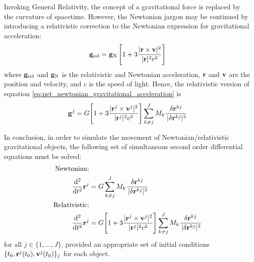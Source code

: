 \documentclass[reprint,english]{revtex4-1}
\begin{document}
Invoking General Relativity, the concept of a gravitational force is replaced by the curvature of spacetime. However, the Newtonian jargon may be continued by introducing a relativistic correction to the Newtonian expression for gravitational acceleration:
\begin{equation}\label{eq:relativistic_gravitational_acceleration}
\vb{g}_\text{rel}=\vb{g}_\text{N}\,\Bigg[1+3\frac{|\vb{r}\times\vb{v}|^2}{|\vb{r}|^2c^2}\Bigg]
\end{equation}
where \(\vb{g}_\text{rel}\) and \(\vb{g}_\text{N}\) is the relativistic and Newtonian acceleration, \(\vb{r}\) and \(\vb{v}\) are the position and velocity, and \(c\) is the speed of light. Hence, the relativistic version of equation \eqref{eq:net_newtonian_gravitational_acceleration} is
\begin{equation}\label{eq:net_relativistic_gravitational_acceleration}
\vb{g}^j=G\Bigg[1+3\frac{|\vb{r}^j\times\vb{v}^j|^2}{|\vb{r}^j|^2c^2}\Bigg]\sum_{k\neq j}^JM_k\frac{\delta\vb{r}^{kj}}{\,|\delta\vb{r}^{kj}|^3}
\end{equation}

In conclusion, in order to simulate the movement of Newtonian/relativistic gravitational objects, the following set of simultaneous second order differential equations must be solved:
\begin{subequations}\label{eq:main_problem}
\begin{align}
\text{Newtonian:}&\nonumber\\
\dv[2]{t}\vb{r}^j&=G\sum_{k\neq j}^JM_k\frac{\delta\vb{r}^{kj}}{\,|\delta\vb{r}^{kj}|^3}\\
\text{Relativistic:}&\nonumber\\
\dv[2]{t}\vb{r}^j&=G\Bigg[1+3\frac{|\vb{r}^j\times\vb{v}^j|^2}{|\vb{r}^j|^2c^2}\Bigg]\sum_{k\neq j}^JM_k\frac{\delta\vb{r}^{kj}}{\,|\delta\vb{r}^{kj}|^3}
\end{align}
\end{subequations}
for all \(j\in\{1,\ldots,J\}\), provided an appropriate set of initial conditions \(\{t_0,\vb{r}^j(t_0),\vb{v}^j(t_0)\}_ j\) for each object.
\end{document}

